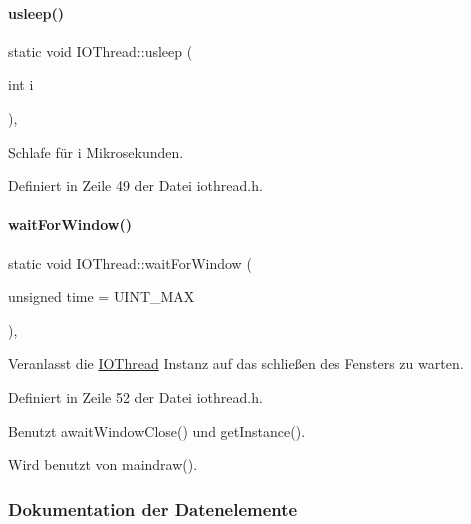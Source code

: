 \paragraph{\texorpdfstring{usleep()}{usleep()}}
{\footnotesize\ttfamily static void I\+O\+Thread\+::usleep (\begin{DoxyParamCaption}\item[{int}]{i }\end{DoxyParamCaption})\hspace{0.3cm}{\ttfamily [inline]}, {\ttfamily [static]}}



Schlafe für {\ttfamily i} Mikrosekunden. 



Definiert in Zeile 49 der Datei iothread.\+h.

\mbox{\label{classIOThread_a0518abc93c6d77c2e085d431d2b8d42c}} 
\paragraph{\texorpdfstring{wait\+For\+Window()}{waitForWindow()}}
{\footnotesize\ttfamily static void I\+O\+Thread\+::wait\+For\+Window (\begin{DoxyParamCaption}\item[{unsigned}]{time = {\ttfamily UINT\+\_\+MAX} }\end{DoxyParamCaption})\hspace{0.3cm}{\ttfamily [inline]}, {\ttfamily [static]}}



Veranlasst die \mbox{\hyperlink{classIOThread}{I\+O\+Thread}} Instanz auf das schließen des Fensters zu warten. 



Definiert in Zeile 52 der Datei iothread.\+h.



Benutzt await\+Window\+Close() und get\+Instance().



Wird benutzt von maindraw().



\subsubsection{Dokumentation der Datenelemente}
\mbox{\label{classIOThread_af2909448c69876879af1fa33f3a8d97a}} 
